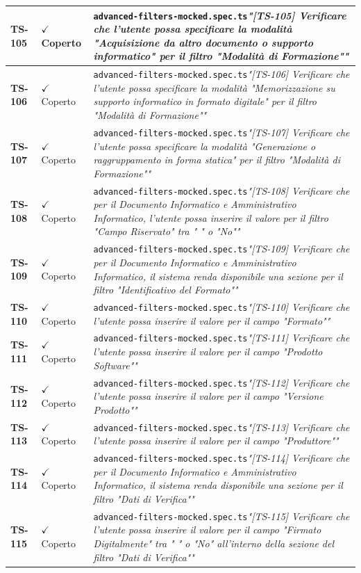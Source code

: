 \documentclass[a4paper,12pt]{article}
\newcommand{\ok}{\textcolor{green!60!black}{$\checkmark$ Coperto}}
\newcommand{\f}[1]{\nolinkurl{#1}\newline}
\newcommand{\q}[1]{\textit{#1}}
\begin{document}
\begin{longtable}{|p{1.5cm}|p{3.0cm}|p{10.5cm}|}
\textbf{TS-105} & \ok & \f{advanced-filters-mocked.spec.ts}\q{"[TS-105] Verificare che l'utente possa specificare la modalità "Acquisizione da altro documento o supporto informatico" per il filtro "Modalità di Formazione""} \\ \hline
\textbf{TS-106} & \ok & \f{advanced-filters-mocked.spec.ts}\q{"[TS-106] Verificare che l'utente possa specificare la modalità "Memorizzazione su supporto informatico in formato digitale" per il filtro "Modalità di Formazione""} \\ \hline
\textbf{TS-107} & \ok & \f{advanced-filters-mocked.spec.ts}\q{"[TS-107] Verificare che l'utente possa specificare la modalità "Generazione o raggruppamento in forma statica" per il filtro "Modalità di Formazione""} \\ \hline
\textbf{TS-108} & \ok & \f{advanced-filters-mocked.spec.ts}\q{"[TS-108] Verificare che per il Documento Informatico e Amministrativo Informatico, l'utente possa inserire il valore per il filtro "Campo Riservato" tra " " o "No""} \\ \hline
\textbf{TS-109} & \ok & \f{advanced-filters-mocked.spec.ts}\q{"[TS-109] Verificare che per il Documento Informatico e Amministrativo Informatico, il sistema renda disponibile una sezione per il filtro "Identificativo del Formato""} \\ \hline
\textbf{TS-110} & \ok & \f{advanced-filters-mocked.spec.ts}\q{"[TS-110] Verificare che l'utente possa inserire il valore per il campo "Formato""} \\ \hline
\textbf{TS-111} & \ok & \f{advanced-filters-mocked.spec.ts}\q{"[TS-111] Verificare che l'utente possa inserire il valore per il campo "Prodotto Software""} \\ \hline
\textbf{TS-112} & \ok & \f{advanced-filters-mocked.spec.ts}\q{"[TS-112] Verificare che l'utente possa inserire il valore per il campo "Versione Prodotto""} \\ \hline
\textbf{TS-113} & \ok & \f{advanced-filters-mocked.spec.ts}\q{"[TS-113] Verificare che l'utente possa inserire il valore per il campo "Produttore""} \\ \hline
\textbf{TS-114} & \ok & \f{advanced-filters-mocked.spec.ts}\q{"[TS-114] Verificare che per il Documento Informatico e Amministrativo Informatico, il sistema renda disponibile una sezione per il filtro "Dati di Verifica""} \\ \hline
\textbf{TS-115} & \ok & \f{advanced-filters-mocked.spec.ts}\q{"[TS-115] Verificare che l'utente possa inserire il valore per il campo "Firmato Digitalmente" tra " " o "No" all'interno della sezione del filtro "Dati di Verifica""} \\ \hline

\end{longtable}
\end{document}
